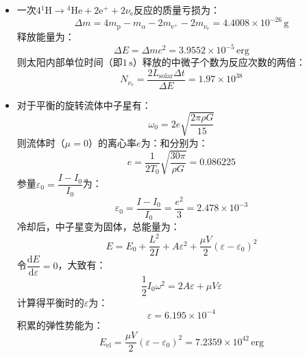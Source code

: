 \documentclass[a4paper,fontset=none]{ctexart}
\begin{document}
\begin{itemize}
        \item[3.]
        一次$4\mathrm{^{1}H} \to \mathrm{^{4}He} + 2\mathrm{e^+} + 2\nu_\mathrm{e}$反应的质量亏损为：
        \[
        \Delta m = 4m_{\mathrm{p}} - m_{\alpha} - 2m_{\mathrm{e^+}} - 2m_{\nu_\mathrm{e}} = 4.4008\times10^{-26}\,\mathrm{g}
        \]
        释放能量为：
        \[
        \Delta E = \Delta mc^2 = 3.9552\times10^{-5}\,\mathrm{erg}
        \]
        则太阳内部单位时间（即$1\,\mathrm{s}$）释放的中微子个数为反应次数的两倍：
        \[
        N_{\nu_\mathrm{e}} = \frac{2L_{\mathrm{solar}}\Delta t}{\Delta E} = 1.97\times10^{38}
        \]

        \item[6.]
        对于平衡的旋转流体中子星有：
        \[
        \omega_0 = 2e\sqrt{\frac{2\pi\rho G}{15}}
        \]
        则流体时（$\mu = 0$）的离心率$e$为：和分别为：
        \[
        e = \frac{1}{2T_0}\sqrt{\frac{30\pi}{\rho G}} = 0.086225
        \]
        参量$\varepsilon_0 = \dfrac{I-I_0}{I_0}$为：
        \[
        \varepsilon_0 = \frac{I-I_0}{I_0} = \frac{e^2}{3} = 2.478\times10^{-3}
        \]
        冷却后，中子星变为固体，总能量为：
        \[
        E = E_0 + \frac{L^2}{2I} + A\varepsilon^2 + \frac{\mu V}{2}(\varepsilon - \varepsilon_0)^2
        \]
        令$\dfrac{\mathrm{d}E}{\mathrm{d}\varepsilon} = 0$，大致有：
        \[
        \frac{1}{2}I_0\omega^2 = 2A\varepsilon + \mu V\varepsilon
        \]
        计算得平衡时的$\varepsilon$为：
        \[
        \varepsilon = 6.195\times10^{-4}
        \]
        积累的弹性势能为：
        \[
        E_\mathrm{el} = \frac{\mu V}{2}(\varepsilon - \varepsilon_0)^2 = 7.2359\times10^{42}\,\mathrm{erg}
        \]


\end{itemize}
\end{document}
